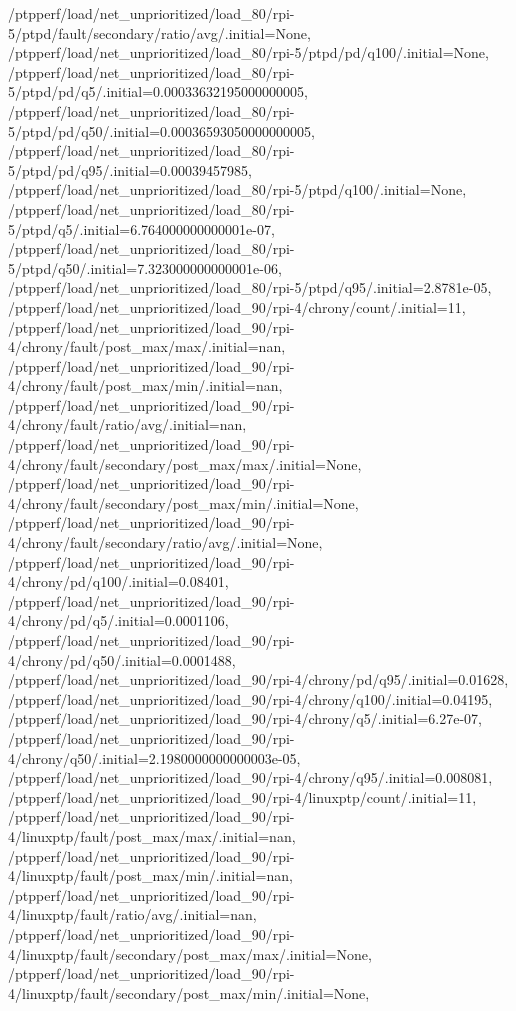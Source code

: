 {    /ptpperf/load/net_unprioritized/load_80/rpi-5/ptpd/fault/secondary/ratio/avg/.initial=None,
    /ptpperf/load/net_unprioritized/load_80/rpi-5/ptpd/pd/q100/.initial=None,
    /ptpperf/load/net_unprioritized/load_80/rpi-5/ptpd/pd/q5/.initial=0.00033632195000000005,
    /ptpperf/load/net_unprioritized/load_80/rpi-5/ptpd/pd/q50/.initial=0.00036593050000000005,
    /ptpperf/load/net_unprioritized/load_80/rpi-5/ptpd/pd/q95/.initial=0.00039457985,
    /ptpperf/load/net_unprioritized/load_80/rpi-5/ptpd/q100/.initial=None,
    /ptpperf/load/net_unprioritized/load_80/rpi-5/ptpd/q5/.initial=6.764000000000001e-07,
    /ptpperf/load/net_unprioritized/load_80/rpi-5/ptpd/q50/.initial=7.323000000000001e-06,
    /ptpperf/load/net_unprioritized/load_80/rpi-5/ptpd/q95/.initial=2.8781e-05,
    /ptpperf/load/net_unprioritized/load_90/rpi-4/chrony/count/.initial=11,
    /ptpperf/load/net_unprioritized/load_90/rpi-4/chrony/fault/post_max/max/.initial=nan,
    /ptpperf/load/net_unprioritized/load_90/rpi-4/chrony/fault/post_max/min/.initial=nan,
    /ptpperf/load/net_unprioritized/load_90/rpi-4/chrony/fault/ratio/avg/.initial=nan,
    /ptpperf/load/net_unprioritized/load_90/rpi-4/chrony/fault/secondary/post_max/max/.initial=None,
    /ptpperf/load/net_unprioritized/load_90/rpi-4/chrony/fault/secondary/post_max/min/.initial=None,
    /ptpperf/load/net_unprioritized/load_90/rpi-4/chrony/fault/secondary/ratio/avg/.initial=None,
    /ptpperf/load/net_unprioritized/load_90/rpi-4/chrony/pd/q100/.initial=0.08401,
    /ptpperf/load/net_unprioritized/load_90/rpi-4/chrony/pd/q5/.initial=0.0001106,
    /ptpperf/load/net_unprioritized/load_90/rpi-4/chrony/pd/q50/.initial=0.0001488,
    /ptpperf/load/net_unprioritized/load_90/rpi-4/chrony/pd/q95/.initial=0.01628,
    /ptpperf/load/net_unprioritized/load_90/rpi-4/chrony/q100/.initial=0.04195,
    /ptpperf/load/net_unprioritized/load_90/rpi-4/chrony/q5/.initial=6.27e-07,
    /ptpperf/load/net_unprioritized/load_90/rpi-4/chrony/q50/.initial=2.1980000000000003e-05,
    /ptpperf/load/net_unprioritized/load_90/rpi-4/chrony/q95/.initial=0.008081,
    /ptpperf/load/net_unprioritized/load_90/rpi-4/linuxptp/count/.initial=11,
    /ptpperf/load/net_unprioritized/load_90/rpi-4/linuxptp/fault/post_max/max/.initial=nan,
    /ptpperf/load/net_unprioritized/load_90/rpi-4/linuxptp/fault/post_max/min/.initial=nan,
    /ptpperf/load/net_unprioritized/load_90/rpi-4/linuxptp/fault/ratio/avg/.initial=nan,
    /ptpperf/load/net_unprioritized/load_90/rpi-4/linuxptp/fault/secondary/post_max/max/.initial=None,
    /ptpperf/load/net_unprioritized/load_90/rpi-4/linuxptp/fault/secondary/post_max/min/.initial=None,
}
